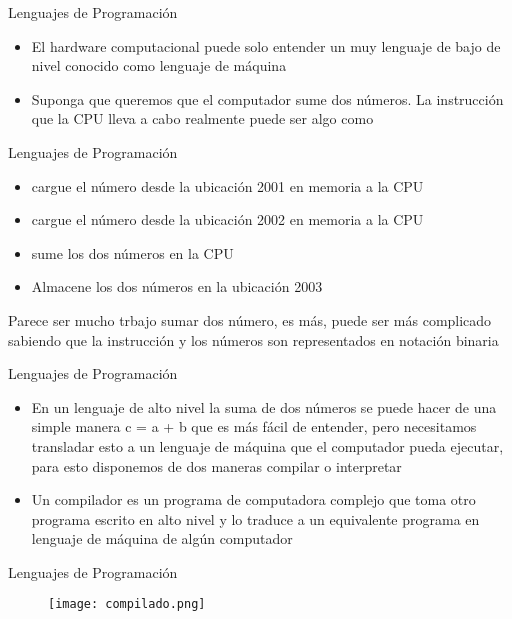 \documentclass[ignorenonframetext,]{beamer}
\begin{document}
\begin{frame}{Lenguajes de Programación}

\begin{itemize}
\item
  El hardware computacional puede solo entender un muy lenguaje de bajo
  de nivel conocido como lenguaje de máquina
\item
  Suponga que queremos que el computador sume dos números. La
  instrucción que la CPU lleva a cabo realmente puede ser algo como
\end{itemize}

\end{frame}

\begin{frame}{Lenguajes de Programación}

\begin{itemize}
\item
  cargue el número desde la ubicación 2001 en memoria a la CPU
\item
  cargue el número desde la ubicación 2002 en memoria a la CPU
\item
  sume los dos números en la CPU
\item
  Almacene los dos números en la ubicación 2003
\end{itemize}

Parece ser mucho trbajo sumar dos número, es más, puede ser más
complicado sabiendo que la instrucción y los números son representados
en notación binaria

\end{frame}

\begin{frame}{Lenguajes de Programación}

\begin{itemize}
\item
  En un lenguaje de alto nivel la suma de dos números se puede hacer de
  una simple manera c = a + b que es más fácil de entender, pero
  necesitamos transladar esto a un lenguaje de máquina que el computador
  pueda ejecutar, para esto disponemos de dos maneras compilar o
  interpretar
\item
  Un compilador es un programa de computadora complejo que toma otro
  programa escrito en alto nivel y lo traduce a un equivalente programa
  en lenguaje de máquina de algún computador
\end{itemize}

\end{frame}

\begin{frame}{Lenguajes de Programación}

\begin{center}
\begin{figure}
\texttt{[image: compilado.png]}
\end{figure}
\end{center}

\end{frame}
\end{document}
